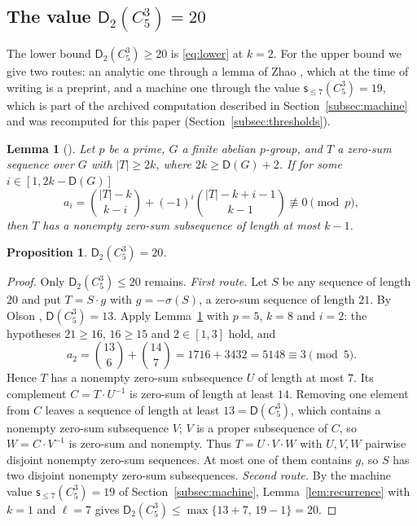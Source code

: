 \documentclass[11pt]{article}
\newtheorem{lemma}[theorem]{Lemma}
\newtheorem{proposition}[theorem]{Proposition}
\theoremstyle{definition}
\theoremstyle{remark}
\newcommand{\Dk}{\mathsf{D}}
\newcommand{\C}{C_5^{3}}
\newcommand{\sle}[1]{\mathsf{s}_{\le #1}}
\begin{document}
\subsection{The value $\Dk_2(\C)=20$}

The lower bound $\Dk_2(\C)\ge20$ is \eqref{eq:lower} at $k=2$. For the upper bound we give two routes: an analytic one through a lemma of Zhao \cite[Lemma~4.4]{Zhao2025}, which at the time of writing is a preprint, and a machine one through the value $\sle{7}(\C)=19$, which is part of the archived computation described in Section~\ref{subsec:machine} and was recomputed for this paper (Section~\ref{subsec:thresholds}).

\begin{lemma}[{\cite[Lemma~4.4]{Zhao2025}}]\label{lem:zhao}
Let $p$ be a prime, $G$ a finite abelian $p$-group, and $T$ a zero-sum sequence over $G$ with $|T|\ge2k$, where $2k\ge\Dk(G)+2$. If for some $i\in[1,2k-\Dk(G)]$
\[
a_i=\binom{|T|-k}{k-i}+(-1)^i\binom{|T|-k+i-1}{k-1}\not\equiv0\pmod p,
\]
then $T$ has a nonempty zero-sum subsequence of length at most $k-1$.
\end{lemma}

\begin{proposition}\label{prop:D2}
$\Dk_2(\C)=20$.
\end{proposition}

\begin{proof}
Only $\Dk_2(\C)\le20$ remains. \emph{First route.} Let $S$ be any sequence of length $20$ and put $T=S\cdot g$ with $g=-\sigma(S)$, a zero-sum sequence of length $21$. By Olson \cite{Olson1969}, $\Dk(\C)=13$. Apply Lemma~\ref{lem:zhao} with $p=5$, $k=8$ and $i=2$: the hypotheses $21\ge16$, $16\ge15$ and $2\in[1,3]$ hold, and
\[
a_2=\binom{13}{6}+\binom{14}{7}=1716+3432=5148\equiv3\pmod{5}.
\]
Hence $T$ has a nonempty zero-sum subsequence $U$ of length at most $7$. Its complement $C=T\cdot U^{-1}$ is zero-sum of length at least $14$. Removing one element from $C$ leaves a sequence of length at least $13=\Dk(\C)$, which contains a nonempty zero-sum subsequence $V$; $V$ is a proper subsequence of $C$, so $W=C\cdot V^{-1}$ is zero-sum and nonempty. Thus $T=U\cdot V\cdot W$ with $U,V,W$ pairwise disjoint nonempty zero-sum sequences. At most one of them contains $g$, so $S$ has two disjoint nonempty zero-sum subsequences. \emph{Second route.} By the machine value $\sle{7}(\C)=19$ of Section~\ref{subsec:machine}, Lemma~\ref{lem:recurrence} with $k=1$ and $\ell=7$ gives $\Dk_2(\C)\le\max\{13+7,\,19-1\}=20$.
\end{proof}
\end{document}
